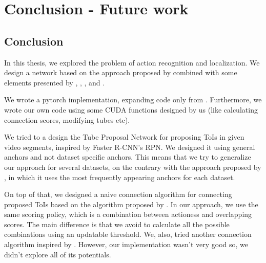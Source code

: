 


% 

\chapter{Conclusion - Future work}

\section{Conclusion}
In this thesis, we explored the problem of action recognition and localization. We design a network based on the approach proposed by \cite{DBLP:journals/corr/HouCS17}
combined with some elements presented by \cite{DBLP:journals/corr/abs-1712-09184}, \cite{Ren:2015:FRT:2969239.2969250}, \cite{Girshick:2015:FR:2919332.2920125},
\cite{DBLP:journals/corr/abs-1903-00304} and \cite{hara3dcnns}. \par

We wrote a pytorch implementation, expanding code only from \cite{jjfaster2rcnn}. Furthermore, we wrote our own code using some CUDA functions designed by us (like
calculating connection scores, modifying tubes etc). \par

We tried to  a design the  Tube Proposal Network for proposing ToIs in given video segments, inspired by Faster R-CNN's RPN.
We designed it using general anchors and not dataset specific anchors. This means that we try to generalize our approach for several datasets, on the contrary with
the approach proposed by \cite{DBLP:journals/corr/abs-1712-09184}, in which it uses the most frequently appearing anchors for each dataset.

On top of that, we designed a naive connection algorithm for connecting  proposed ToIs based on the algorithm proposed by \cite{DBLP:journals/corr/abs-1712-09184}.
In our approach, we use the same scoring policy, which is a combination between actioness and overlapping scores. The main difference is that we avoid to calculate
all the possible combinations using an updatable threshold. We, also, tried another connection algorithm inspired by \cite{DBLP:journals/corr/abs-1903-00304}. However,
our implementation wasn't very good so, we didn't explore all of its potentials. \par

